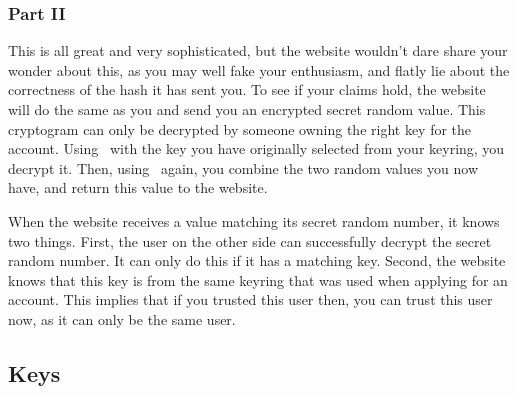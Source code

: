 \subsubsection{Part II}
This is all great and very sophisticated, but the website wouldn't dare share your wonder about this,
as you may well fake your enthusiasm, and flatly lie about the correctness of the hash it has sent you.
To see if your claims hold,
the website will do the same as you and send you an encrypted secret random value.
This cryptogram can only be decrypted by someone owning the right key for the account.
Using \XOR\ with the key you have originally selected from your keyring,
you decrypt it.
Then,
using \XOR\ again,
you combine the two random values you now have,
and return this value to the website.
\par
When the website receives a value matching its secret random number, it knows two things.
First, the user on the other side can successfully decrypt the secret random number.
It can only do this if it has a matching key.
Second, the website knows that this key is from the same keyring that was used when applying for an account.
This implies that if you trusted this user then, you can trust this user now, as it can only be the same user.

\subsection{Keys}
